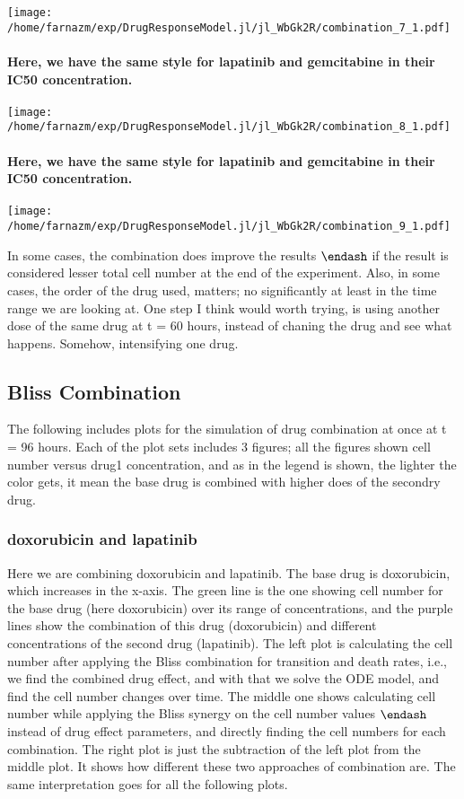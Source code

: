 \documentclass[12pt,a4paper]{article}
\begin{document}
\texttt{[image: /home/farnazm/exp/DrugResponseModel.jl/jl\_WbGk2R/combination\_7\_1.pdf]}

\paragraph{Here, we have the same style for lapatinib and gemcitabine in their IC50 concentration.}

\texttt{[image: /home/farnazm/exp/DrugResponseModel.jl/jl\_WbGk2R/combination\_8\_1.pdf]}

\paragraph{Here, we have the same style for lapatinib and gemcitabine in their IC50 concentration.}

\texttt{[image: /home/farnazm/exp/DrugResponseModel.jl/jl\_WbGk2R/combination\_9\_1.pdf]}

In some cases, the combination does improve the results \ensuremath{\endash} if the result is considered lesser total cell number at the end of the experiment. Also, in some cases, the order of the drug used, matters; no significantly at least in the time range we are looking at. One step I think would worth trying, is using another dose of the same drug at t = 60 hours, instead of chaning the drug and see what happens. Somehow, intensifying one drug.

\subsection{Bliss Combination}
The following includes plots for the simulation of drug combination at once at t = 96 hours. Each of the plot sets includes 3 figures; all the figures shown cell number versus drug1 concentration, and as in the legend is shown, the lighter the color gets, it mean the base drug is combined with higher does of the secondry drug.

\subsubsection{doxorubicin and lapatinib}
Here we are combining doxorubicin and lapatinib. The base drug is doxorubicin, which increases in the x-axis. The green line is the one showing cell number for the base drug (here doxorubicin) over its range of concentrations, and the purple lines show the combination of this drug (doxorubicin) and different concentrations of the second drug (lapatinib). The left plot is calculating the cell number after applying the Bliss combination for transition and death rates, i.e., we find the combined drug effect, and with that we solve the ODE model, and find the cell number changes over time. The middle one shows calculating cell number while applying the Bliss synergy on the cell number values \ensuremath{\endash} instead of drug effect parameters, and directly finding the cell numbers for each combination. The right plot is just the subtraction of the left plot from the middle plot. It shows how different these two approaches of combination are. The same interpretation goes for all the following plots.
\end{document}
